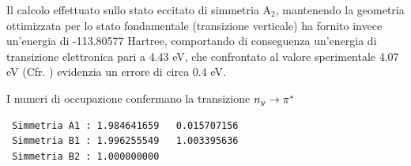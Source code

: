 
Il calcolo effettuato sullo stato eccitato di simmetria A$_2$, mantenendo la
geometria ottimizzata per lo stato fondamentale (transizione verticale) ha fornito
invece un'energia di -113.80577 Hartree, comportando di conseguenza un'energia di
transizione elettronica pari a 4.43 eV, che confrontato al valore sperimentale
4.07 eV (Cfr. \cite{jpc-99-20-1995-8050}) evidenzia un errore di circa 0.4 eV. 

I numeri di occupazione confermano la transizione $n_y \rightarrow \pi^{*}$
\begin{verbatim}
 Simmetria A1 : 1.984641659   0.015707156
 Simmetria B1 : 1.996255549   1.003395636
 Simmetria B2 : 1.000000000
\end{verbatim}

